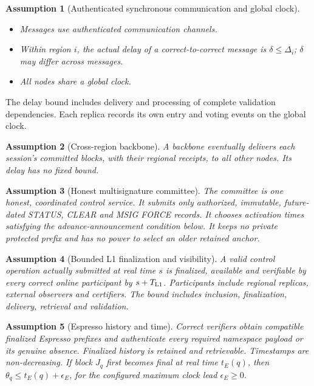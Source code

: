 \documentclass[11pt,a4paper]{article}
\newtheorem{assumption}[assumption]{Assumption}
\begin{document}
\begin{assumption}[Authenticated synchronous communication and global clock]
\label{ass:network}
\leavevmode\par
\begin{itemize}
\item Messages use authenticated communication channels.
\item Within region $i$, the actual delay of a correct-to-correct
message is $\delta\le\Delta_i$; $\delta$ may differ across messages.
\item All nodes share a global clock.
\end{itemize}
\end{assumption}
The delay bound includes delivery and processing of complete validation
dependencies. Each replica records its own entry and voting events on
the global clock.

\begin{assumption}[Cross-region backbone]
\label{ass:backbone}
A backbone eventually delivers each session's committed blocks, with
their regional receipts, to all other nodes. Its delay has no fixed
bound.
\end{assumption}



\begin{assumption}[Honest multisignature committee]
\label{ass:committee}
The committee is one honest, coordinated control service. It submits
only authorized, immutable, future-dated STATUS, CLEAR and MSIG FORCE
records. It chooses activation times satisfying the advance-announcement
condition below. It keeps no private protected prefix and has no power
to select an older retained anchor.
\end{assumption}

\begin{assumption}[Bounded L1 finalization and visibility]
\label{ass:monitor}
A valid control operation actually submitted at real time $s$ is
finalized, available and verifiable by every correct online participant
by $s+T_{\rm L1}$. Participants include regional replicas, external
observers and certifiers. The bound includes inclusion, finalization,
delivery, retrieval and validation.
\end{assumption}

\begin{assumption}[Espresso history and time]
\label{ass:espresso}
Correct verifiers obtain compatible finalized Espresso prefixes and
authenticate every required namespace payload or its genuine absence.
Finalized history is retained and retrievable. Timestamps are
non-decreasing. If block $J_q$ first becomes final at real time
$t_E(q)$, then $\theta_q\le t_E(q)+\epsilon_E$, for the configured
maximum clock lead $\epsilon_E\ge0$.
\end{assumption}
\end{document}
